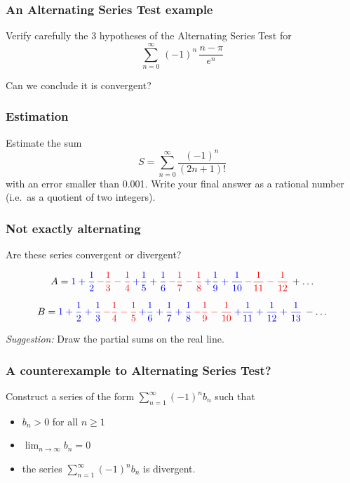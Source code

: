\documentclass[14pt]{beamer}
\begin{document}
\begin{frame}[t]
	\frametitle{ An Alternating Series Test example}

	Verify carefully the 3 hypotheses of the Alternating Series Test for
	\[
		\sum_{n=0}^{\infty}\, (-1)^{n}\, \frac{n - \pi}{e^{n}}
	\]

	Can we conclude it is convergent?
\end{frame}

\begin{frame}[t]
	\frametitle{Estimation}

	Estimate the sum
	\[
		S = \sum_{n=0}^{\infty}\frac{(-1)^{n}}{(2n+1)!}
	\]
	with an error smaller than 0.001. Write your final answer as a rational number
	(i.e.\ as a quotient of two integers).
\end{frame}

\begin{frame}[t]
	\fontsize{13}{13}\selectfont
	\frametitle{Not exactly alternating}

	Are these series convergent or divergent?

	\[
		A ={\color{blue} 1 + \frac{1}{2}}\,{\color{red} - \frac{1}{3} - \frac{1}{4}}\,
		{\color{blue} + \frac{1}{5} + \frac{1}{6}}\,{\color{red} - \frac{1}{7} - \frac{1}{8}}
		\,{\color{blue} + \frac{1}{9} + \frac{1}{10}}\,{\color{red} - \frac{1}{11} - \frac{1}{12}}
		\, + \ldots
	\]

	\[
		B ={\color{blue} 1 + \frac{1}{2} + \frac{1}{3}}\,{\color{red} - \frac{1}{4} - \frac{1}{5}}
		\,{\color{blue} + \frac{1}{6} + \frac{1}{7} + \frac{1}{8}}\,{\color{red} - \frac{1}{9} - \frac{1}{10}}
		\,{\color{blue} + \frac{1}{11} + \frac{1}{12} + \frac{1}{13}}\, - \ldots
	\]
	\vspace{.2cm}

	\emph{Suggestion:} Draw the partial sums on the real line.
\end{frame}

\begin{frame}[t]
	\frametitle{A counterexample to Alternating Series Test?}

	Construct a series of the form
	$\displaystyle \sum_{n=1}^{\infty}(-1)^{n}b_{n}$ such that
	\begin{itemize}
		\item $\displaystyle b_{n}>0$ for all $n \geq 1$
			\vspace{.4cm}

		\item $\displaystyle \lim_{n \to \infty}b_{n}= 0$

		\item the series $\displaystyle \sum_{n=1}^{\infty}(-1)^{n}b_{n}$ is divergent.
	\end{itemize}
\end{frame}
\end{document}
